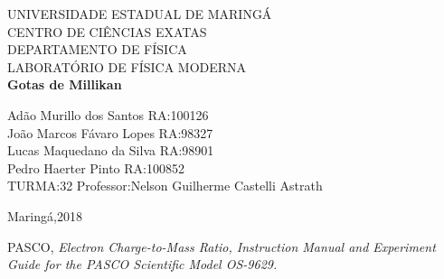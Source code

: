 \documentclass[a4paper,10pt]{article}
\begin{document}
	
	\begin{titlepage}
		\begin{center}
		{\large UNIVERSIDADE ESTADUAL DE MARINGÁ}\\[0.2cm]
		{\large CENTRO DE CIÊNCIAS EXATAS}\\[0.2cm]
		{\large DEPARTAMENTO DE FÍSICA}\\[0.2cm]
		{\large LABORATÓRIO DE FÍSICA MODERNA}\\[7.0cm]
		{\bf \huge Gotas de Millikan}\\[7.0cm]
		\end{center}
	{\large Adão Murillo dos Santos \hfill RA:100126}\\[0.7cm]
	{\large João Marcos Fávaro Lopes \hfill RA:98327}\\[0.7cm]
	{\large Lucas Maquedano da Silva \hfill RA:98901}\\[0.7cm]
	{\large Pedro Haerter Pinto \hfill RA:100852}\\[0.7cm]
	{\large TURMA:32 \hfill Professor:Nelson Guilherme Castelli
	Astrath}
	
	\vfill
		\begin{center}
		{\large Maringá,2018}
		\end{center}
	\end{titlepage}

	\tableofcontents
		
\vspace{3cm}
	\begin{thebibliography}{1}
    	PASCO, \it{Electron Charge-to-Mass Ratio}, Instruction Manual and 	Experiment Guide for the PASCO Scientific Model OS-9629.
	\end{thebibliography}	
	
\end{document}
